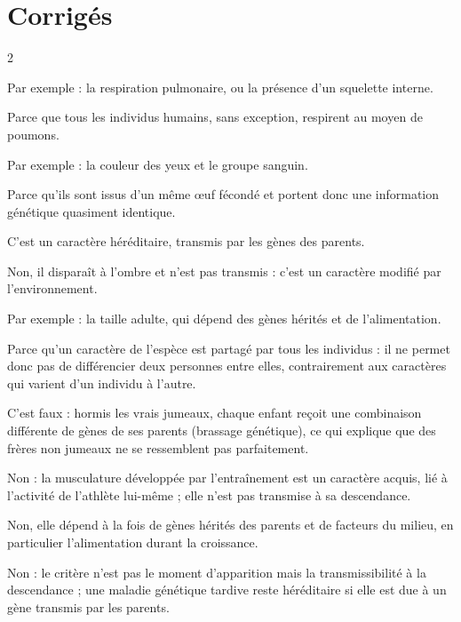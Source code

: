 \section{Corrigés}
\begin{multicols}{2}

Par exemple : la respiration pulmonaire, ou la présence d'un squelette interne.

Parce que tous les individus humains, sans exception, respirent au moyen de poumons.

Par exemple : la couleur des yeux et le groupe sanguin.

Parce qu'ils sont issus d'un même \oe uf fécondé et portent donc une information
génétique quasiment identique.

C'est un caractère héréditaire, transmis par les gènes des parents.

Non, il disparaît à l'ombre et n'est pas transmis : c'est un caractère modifié par
l'environnement.

Par exemple : la taille adulte, qui dépend des gènes hérités et de l'alimentation.

Parce qu'un caractère de l'espèce est partagé par tous les individus : il ne permet
donc pas de différencier deux personnes entre elles, contrairement aux caractères qui
varient d'un individu à l'autre.

C'est faux : hormis les vrais jumeaux, chaque enfant reçoit une combinaison différente
de gènes de ses parents (brassage génétique), ce qui explique que des frères non
jumeaux ne se ressemblent pas parfaitement.

Non : la musculature développée par l'entraînement est un caractère acquis, lié à
l'activité de l'athlète lui-même ; elle n'est pas transmise à sa descendance.

Non, elle dépend à la fois de gènes hérités des parents et de facteurs du milieu, en
particulier l'alimentation durant la croissance.

Non : le critère n'est pas le moment d'apparition mais la transmissibilité à la
descendance ; une maladie génétique tardive reste héréditaire si elle est due à un gène
transmis par les parents.


\end{multicols}
